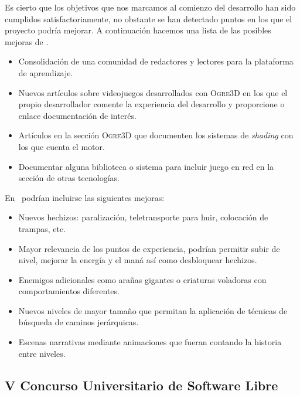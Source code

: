 \documentclass[a4paper,11pt]{article}
\begin{document}
\noindent Es cierto que los objetivos que nos marcamos al comienzo del desarrollo
han sido cumplidos satisfactoriamente, no obstante se han detectado puntos
en los que el proyecto podría mejorar. A continuación hacemos una lista
de las posibles mejoras de \wiki.

\begin{itemize}
    \item Consolidación de una comunidad de redactores y lectores para
    la plataforma de aprendizaje.
    \item Nuevos artículos sobre videojuegos desarrollados con \textsc{Ogre3D}
    en los que el propio desarrollador comente la experiencia del desarrollo
    y proporcione o enlace documentación de interés.
    \item Artículos en la sección \textsc{Ogre3D} que documenten los sistemas
    de \textit{shading} con los que cuenta el motor.
    \item Documentar alguna biblioteca o sistema para incluir juego en red en
    la sección de otras tecnologías.\\
\end{itemize}

\noindent En \juego\ podrían incluirse las siguientes mejoras:


\begin{itemize}
    \item Nuevos hechizos: paralización, teletransporte para huir, colocación
    de trampas, etc.
    \item Mayor relevancia de los puntos de experiencia, podrían permitir
    subir de nivel, mejorar la energía y el maná así como desbloquear
    hechizos.
    \item Enemigos adicionales como arañas gigantes o criaturas voladoras
    con comportamientos diferentes.
    \item Nuevos niveles de mayor tamaño que permitan la aplicación de
    técnicas de búsqueda de caminos jerárquicas.
    \item Escenas narrativas mediante animaciones que fueran contando
    la historia entre niveles.
\end{itemize}


\subsection{V Concurso Universitario de Software Libre}
\end{document}
